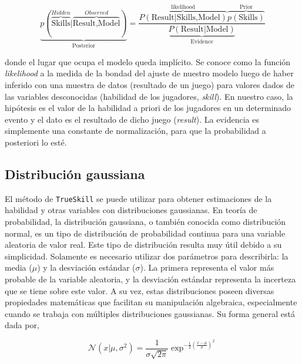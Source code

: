 \documentclass[11pt,twoside,spanish]{report} %
\begin{document}
\begin{equation}\label{eq:inference}
\underbrace{p(\overbrace{\text{Skills}}^{Hidden}|\overbrace{\text{Result,Model}}^{Observed})}_{\text{Posterior}} = \frac{\overbrace{P(\text{Result}|\text{Skills,Model})}^{\text{likelihood}}\overbrace{p(\text{Skills})}^{\text{Prior}}}{\underbrace{P(\text{Result}|\text{Model})}_{\text{Evidence}}}
\end{equation}

donde el lugar que ocupa el modelo queda impl\'icito.
Se conoce como la funci\'on \textit{likelihood}  a la medida de la bondad del ajuste de nuestro modelo luego de haber inferido con una muestra de datos (resultado de un juego) para valores dados de las variables desconocidas (habilidad de los jugadores, \textit{skill}).
En nuestro caso, la hip\'otesis es el valor de la habilidad a priori de los jugadores en un determinado evento y el dato es el resultado de dicho juego (\textit{result}).
La evidencia es simplemente una constante de normalizaci\'on, para que la probabilidad a posteriori lo est\'e.




\subsection{Distribuci\'on gaussiana}\label{Sec:PropiedadesGaussianas}

El m\'etodo de \texttt{TrueSkill} se puede utilizar para obtener estimaciones de la habilidad y otras variables con distribuciones gaussianas.
En teor\'ia de probabilidad, la distribuci\'on gaussiana, o tambi\'en conocida como distribuci\'on normal, es un tipo de distribuci\'on de probabilidad continua para una variable aleatoria de valor real.
Este tipo de distribuci\'on resulta muy \'util debido a su simplicidad. 
Solamente es necesario utilizar dos par\'ametros para describirla: la media ($\mu$) y la desviaci\'on est\'andar ($\sigma$).
La primera representa el valor m\'as probable de la variable aleatoria, y la desviaci\'on est\'andar representa la incerteza que se tiene sobre este valor.
A su vez, estas distribuciones poseen diversas propiedades matem\'aticas que facilitan su manipulaci\'on algebraica, especialmente cuando se trabaja con m\'ultiples distribuciones gaussianas.
Su forma general est\'a dada por,

\begin{equation}
\mathcal{N}(x|\mu, \sigma^2)=\frac{1}{\sigma\sqrt{2\pi}}\exp^{-\frac{1}{2}\left(\frac{x-\mu}{\sigma}\right)^2} \label{ec:gauss}
\end{equation}
\end{document}
